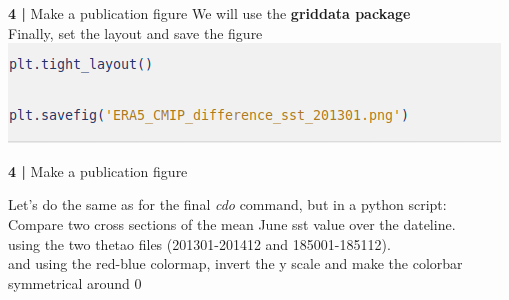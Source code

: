 \begin{frame}{\textbf{4 |} Make a publication figure} 
    We will use the \textbf{griddata package}\\
        \vspace{0.3cm} 
    Finally, set the layout and save the figure \\
    \includegraphics[scale=0.35]{images/Script5_step9.png}
\end{frame}


\begin{frame}{\textbf{4 |} Make a publication figure} 
    \begin{beamerboxesrounded}[lower=gray,shadow=true]{
        Let's do the same as for the final \textit{cdo} command, but in a python script:\\
            \vspace{0.5cm}
        Compare two cross sections of the mean June sst value over the dateline. \\
            \vspace{0.5cm}
        using the two thetao files (201301-201412 and 185001-185112).\\
            \vspace{0.5cm}
        and using the red-blue colormap, invert the y scale and make the colorbar symmetrical around 0\\
            \vspace{2cm}}
    \end{beamerboxesrounded}
\end{frame}



